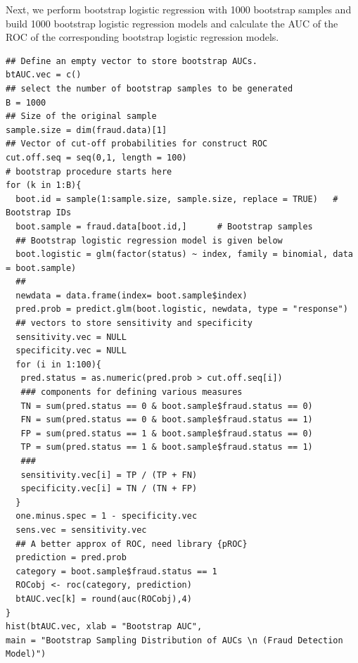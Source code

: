 \documentclass[
]{book}
\newenvironment{Shaded}{\begin{snugshade}}{\end{snugshade}}
\newcommand{\DecValTok}[1]{\textcolor[rgb]{0.00,0.00,0.81}{#1}}
\newcommand{\DocumentationTok}[1]{\textcolor[rgb]{0.56,0.35,0.01}{\textbf{\textit{#1}}}}
\newcommand{\FunctionTok}[1]{\textcolor[rgb]{0.13,0.29,0.53}{\textbf{#1}}}
\newcommand{\NormalTok}[1]{#1}
\newcommand{\OtherTok}[1]{\textcolor[rgb]{0.56,0.35,0.01}{#1}}
\newcommand{\SpecialCharTok}[1]{\textcolor[rgb]{0.81,0.36,0.00}{\textbf{#1}}}
\newcommand{\StringTok}[1]{\textcolor[rgb]{0.31,0.60,0.02}{#1}}
\begin{document}
\begin{Shaded}
\end{Shaded}

Next, we perform bootstrap logistic regression with 1000 bootstrap samples and build 1000 bootstrap logistic regression models and calculate the AUC of the ROC of the corresponding bootstrap logistic regression models.

\begin{verbatim}
## Define an empty vector to store bootstrap AUCs.
btAUC.vec = c()
## select the number of bootstrap samples to be generated
B = 1000
## Size of the original sample
sample.size = dim(fraud.data)[1]
## Vector of cut-off probabilities for construct ROC
cut.off.seq = seq(0,1, length = 100)
# bootstrap procedure starts here
for (k in 1:B){
  boot.id = sample(1:sample.size, sample.size, replace = TRUE)   # Bootstrap IDs
  boot.sample = fraud.data[boot.id,]      # Bootstrap samples         
  ## Bootstrap logistic regression model is given below
  boot.logistic = glm(factor(status) ~ index, family = binomial, data = boot.sample)
  ##
  newdata = data.frame(index= boot.sample$index) 
  pred.prob = predict.glm(boot.logistic, newdata, type = "response")
  ## vectors to store sensitivity and specificity
  sensitivity.vec = NULL
  specificity.vec = NULL
  for (i in 1:100){
   pred.status = as.numeric(pred.prob > cut.off.seq[i])
   ### components for defining various measures
   TN = sum(pred.status == 0 & boot.sample$fraud.status == 0)
   FN = sum(pred.status == 0 & boot.sample$fraud.status == 1)
   FP = sum(pred.status == 1 & boot.sample$fraud.status == 0)
   TP = sum(pred.status == 1 & boot.sample$fraud.status == 1)
   ###
   sensitivity.vec[i] = TP / (TP + FN)
   specificity.vec[i] = TN / (TN + FP)
  }
  one.minus.spec = 1 - specificity.vec
  sens.vec = sensitivity.vec
  ## A better approx of ROC, need library {pROC}
  prediction = pred.prob
  category = boot.sample$fraud.status == 1
  ROCobj <- roc(category, prediction)
  btAUC.vec[k] = round(auc(ROCobj),4)
}
hist(btAUC.vec, xlab = "Bootstrap AUC",
main = "Bootstrap Sampling Distribution of AUCs \n (Fraud Detection Model)")
\end{verbatim}
\end{document}
